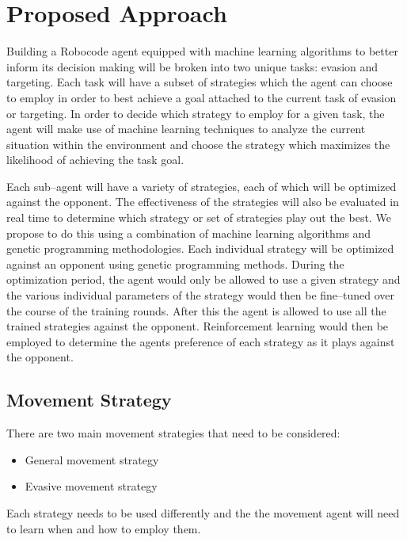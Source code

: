 \documentclass{article}
\theoremstyle{plain}
\theoremstyle{definition}
\theoremstyle{remark}
\begin{document}
\section{Proposed Approach}

Building a Robocode agent equipped with machine learning algorithms to better inform its decision making will be broken into two unique tasks: evasion and targeting. Each task will have a subset of strategies which the agent can choose to employ in order to best achieve a goal attached to the current task of evasion or targeting. In order to decide which strategy to employ for a given task, the agent will make use of machine learning techniques to analyze the current situation within the environment and choose the strategy which maximizes the likelihood of achieving the task goal. 

Each sub--agent will have a variety of strategies, each of which will be optimized against the opponent. The effectiveness of the strategies will also be evaluated in real time to determine which strategy or set of strategies play out the best. We propose to do this using a combination of machine learning algorithms and genetic programming methodologies. Each individual strategy will be optimized against an opponent using genetic programming methods. During the optimization period, the agent would only be allowed to use a given strategy and the various individual parameters of the strategy would then be fine--tuned over the course of the training rounds. After this the agent is allowed to use all the trained strategies against the opponent. Reinforcement learning would then be employed to determine the agents preference of each strategy as it plays against the opponent.

\subsection*{Movement Strategy}

There are two main movement strategies that need to be considered:
\begin{itemize}

\item General movement strategy

\item Evasive movement strategy
\end{itemize}

Each strategy needs to be used differently and the the movement agent will need to learn when and how to employ them.
\end{document}
